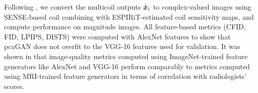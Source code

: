 \documentclass{article}
\theoremstyle{plain}
\theoremstyle{definition}
\theoremstyle{remark}
\newcommand{\hvec}[1]{\ensuremath{\Hat{\boldsymbol{#1}}}}
\begin{document}
Following \cite{Bendel:NIPS:23}, we convert the multicoil outputs $\hvec{x}_i$ to complex-valued images using SENSE-based coil combining \cite{Prussmann:MRM:99} with ESPIRiT-estimated \cite{Uecker:MRM:14} coil sensitivity maps, and compute performance on magnitude images.
All feature-based metrics (CFID, FID, LPIPS, DISTS) were computed with AlexNet features to show that pcaGAN does not overfit to the VGG-16 features used for validation.
It was shown in \cite{Adamson:NIPSW:23} that image-quality metrics computed using ImageNet-trained feature generators like AlexNet and VGG-16 perform comparably to metrics computed using MRI-trained feature generators in terms of correlation with radiologists' scores.

\begin{table}[t]
  \caption{Average MRI results at acceleration $R\in\{4,8\}$ %
    }
  \label{tab:mriresults}
  \centering
\end{table}
\end{document}
